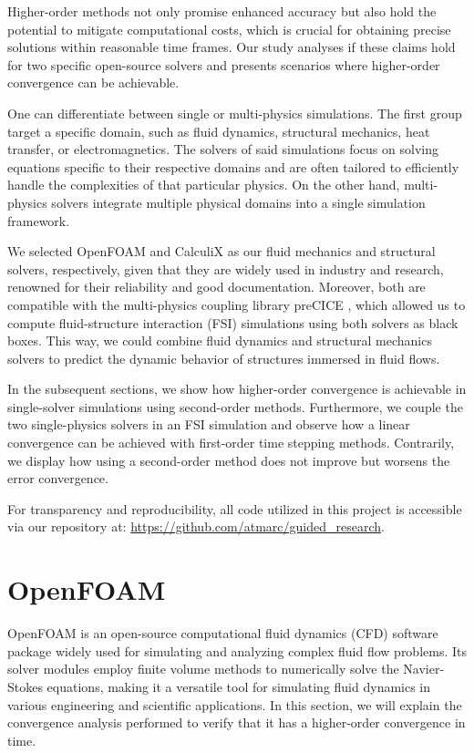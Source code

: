 \documentclass[
  english,        %
  font=times,     %
  onecolumn,      %
]{tumarticle}
\begin{document}
Higher-order methods not only promise enhanced accuracy but also hold the potential to mitigate computational costs, which is crucial for obtaining precise solutions within reasonable time frames. Our study analyses if these claims hold for two specific open-source solvers and presents scenarios where higher-order convergence can be achievable. 

One can differentiate between single or multi-physics simulations. The first group target a specific domain, such as fluid dynamics, structural mechanics, heat transfer, or electromagnetics. The solvers of said simulations focus on solving equations specific to their respective domains and are often tailored to efficiently handle the complexities of that particular physics. On the other hand, multi-physics solvers integrate multiple physical domains into a single simulation framework. 

We selected OpenFOAM \cite{weller1998tensorial} and CalculiX \cite{calculix-web} as our fluid mechanics and structural solvers, respectively, given that they are widely used in industry and research, renowned for their reliability and good documentation. Moreover, both are compatible with the multi-physics coupling library preCICE \cite{preCICEv2}, which allowed us to compute fluid-structure interaction (FSI) simulations using both solvers as black boxes. This way, we could combine fluid dynamics and structural mechanics solvers to predict the dynamic behavior of structures immersed in fluid flows.

In the subsequent sections, we show how higher-order convergence is achievable in single-solver simulations using second-order methods. Furthermore, we couple the two single-physics solvers in an FSI simulation and observe how a linear convergence can be achieved with first-order time stepping methods. Contrarily, we display how using a second-order method does not improve but worsens the error convergence.

For transparency and reproducibility, all code utilized in this project is accessible via our repository at: \url{https://github.com/atmarc/guided_research}. 

\section{OpenFOAM}
OpenFOAM is an open-source computational fluid dynamics (CFD) software package widely used for simulating and analyzing complex fluid flow problems. Its solver modules employ finite volume methods to numerically solve the Navier-Stokes equations, making it a versatile tool for simulating fluid dynamics in various engineering and scientific applications. In this section, we will explain the convergence analysis performed to verify that it has a higher-order convergence in time.   
\end{document}
